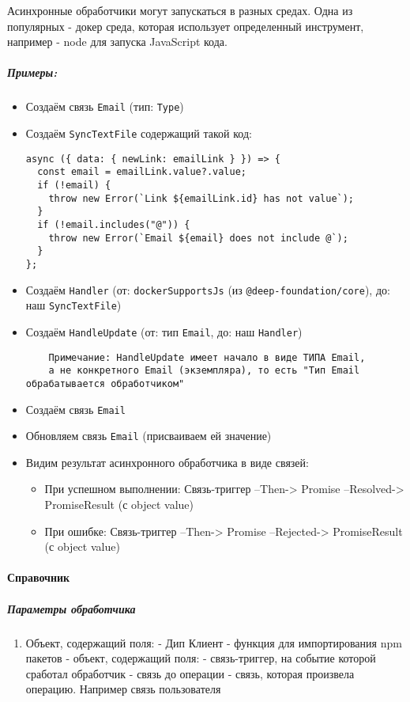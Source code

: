 \documentclass{article}
\begin{document}
Асинхронные обработчики могут запускаться в разных средах. Одна из популярных -
докер среда, которая использует определенный инструмент, например - node для
запуска JavaScript кода.
\subparagraph{Примеры:}

\begin{itemize}
  \item Создаём связь \texttt{Email} (тип: \texttt{Type})
  \item Создаём \texttt{SyncTextFile} содержащий такой код:
        \begin{lstlisting}
async ({ data: { newLink: emailLink } }) => {
  const email = emailLink.value?.value;
  if (!email) {
    throw new Error(`Link ${emailLink.id} has not value`);
  }
  if (!email.includes("@")) {
    throw new Error(`Email ${email} does not include @`);
  }
};
\end{lstlisting}
  \item Создаём \texttt{Handler} (от: \texttt{dockerSupportsJs} (из
        \texttt{@deep-foundation/core}), до: наш \texttt{SyncTextFile})
  \item Создаём \texttt{HandleUpdate} (от: тип \texttt{Email}, до: наш
        \texttt{Handler})
        \begin{verbatim}
    Примечание: HandleUpdate имеет начало в виде ТИПА Email,
    а не конкретного Email (экземпляра), то есть "Тип Email обрабатывается обработчиком"
    \end{verbatim}
  \item Создаём связь \texttt{Email}
  \item Обновляем связь \texttt{Email} (присваиваем ей значение)
  \item Видим результат асинхронного обработчика в виде связей:
        \begin{itemize}
          \item При успешном выполнении: Связь-триггер --Then-> Promise
                --Resolved-> PromiseResult (с object value)
          \item При ошибке: Связь-триггер --Then-> Promise --Rejected->
                PromiseResult (с object value)
        \end{itemize}
\end{itemize}

\paragraph{Справочник}
\subparagraph{Параметры обработчика}
\begin{enumerate}
  \item Объект, содержащий поля:
         - Дип Клиент
         - функция для импортирования npm пакетов
         - объект, содержащий поля:
         - связь-триггер, на событие которой сработал
        обработчик
         - связь до операции
         - связь, которая произвела операцию.
        Например связь пользователя
\end{enumerate}
\end{document}
